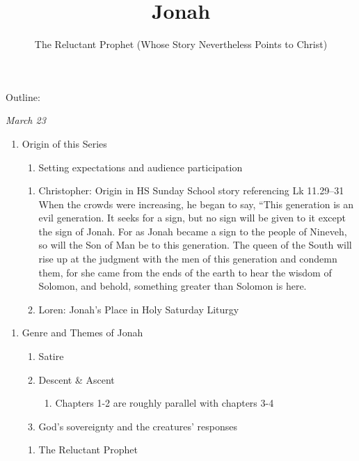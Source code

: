 \documentclass[
]{article}
\title{Jonah}
\subtitle{The Reluctant Prophet (Whose Story Nevertheless Points to
Christ)}
\author{}
\date{}
\newcommand{\RL}[1]{\beginR #1\endR}
\begin{document}
\maketitle

Outline:

\emph{March 23}

\begin{enumerate}
\def\labelenumi{\arabic{enumi}.}
\item
  Origin of this Series

  \begin{enumerate}
  \def\labelenumii{\arabic{enumii}.}
  \item
    Setting expectations and audience participation
  \end{enumerate}

  \begin{enumerate}
  \def\labelenumii{\arabic{enumii}.}
  \item
    Christopher: Origin in HS Sunday School story referencing Lk
    11.29--31\\
    When the crowds were increasing, he began to say, \RL{``}This
    generation is an evil generation. It seeks for a sign, but no sign
    will be given to it except the sign of Jonah. For as Jonah became a
    sign to the people of Nineveh, so will the Son of Man be to this
    generation. The queen of the South will rise up at the judgment with
    the men of this generation and condemn them, for she came from the
    ends of the earth to hear the wisdom of Solomon, and behold,
    something greater than Solomon is here.
  \item
    Loren: Jonah's Place in Holy Saturday Liturgy
  \end{enumerate}
\end{enumerate}

\begin{enumerate}
\def\labelenumi{\arabic{enumi}.}
\item
  Genre and Themes of Jonah

  \begin{enumerate}
  \def\labelenumii{\arabic{enumii}.}
  \item
    Satire
  \item
    Descent \& Ascent

    \begin{enumerate}
    \def\labelenumiii{\arabic{enumiii}.}
    \item
      Chapters 1-2 are roughly parallel with chapters 3-4
    \end{enumerate}
  \item
    God's sovereignty and the creatures' responses
  \end{enumerate}

  \begin{enumerate}
  \def\labelenumii{\arabic{enumii}.}
  \item
    The Reluctant Prophet
  \end{enumerate}
\end{enumerate}
\end{document}
